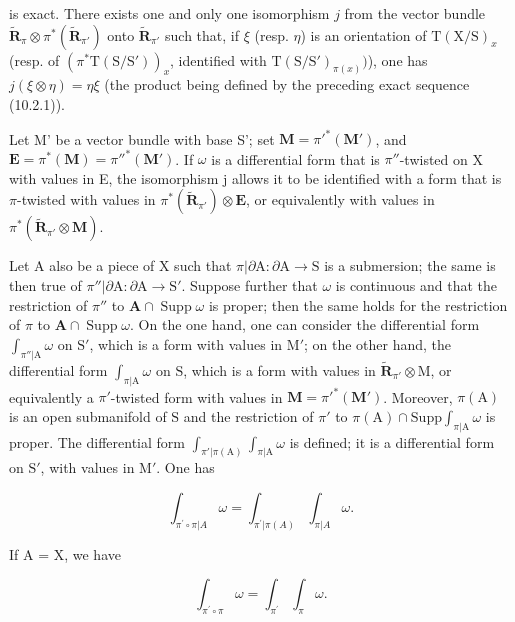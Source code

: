 is exact. There exists one and only one isomorphism \(j\) from the vector bundle \(\tilde{\mathbf{R}}_{\pi} \otimes \pi^{*}(\tilde{\mathbf{R}}_{\pi'})\) onto \(\tilde{\mathbf{R}}_{\pi'}\) such that, if \(\xi\) (resp. \(\eta\)) is an orientation of \(\mathrm{T}(\mathrm{X}/\mathrm{S})_x\) (resp. of \((\pi^{*}\mathrm{T}(\mathrm{S}/\mathrm{S}'))_x\), identified with \(\mathrm{T}(\mathrm{S}/\mathrm{S}')_{\pi(x)})\)), one has \(j(\xi \otimes \eta) = \eta\xi\) (the product being defined by the preceding exact sequence (10.2.1)).

Let M' be a vector bundle with base S'; set \(\mathbf{M} = \pi'^{*}(\mathbf{M}')\), and \(\mathbf{E}=\pi^{*}(\mathbf{M})=\pi''^{*}(\mathbf{M}')\). If \(\omega\) is a differential form that is \(\pi''\)-twisted on X with values in E, the isomorphism j allows it to be identified with a form that is \(\pi\)-twisted with values in \(\pi^{*}(\tilde{\mathbf{R}}_{\pi'}) \otimes \mathbf{E}\), or equivalently with values in \(\pi^{*}(\tilde{\mathbf{R}}_{\pi'} \otimes \mathbf{M})\).

Let A also be a piece of X such that \(\pi|\partial\mathrm{A}:\partial\mathrm{A}\to\mathrm{S}\) is a submersion; the same is then true of \(\pi''|\partial\mathrm{A}:\partial\mathrm{A}\to\mathrm{S}'\). Suppose further that \(\omega\) is continuous and that the restriction of \(\pi''\) to \(\mathbf{A}\cap\operatorname{Supp}\omega\) is proper; then the same holds for the restriction of \(\pi\) to \(\mathbf{A}\cap\operatorname{Supp}\omega\). On the one hand, one can consider the differential form \(\int_{\pi''|\mathrm{A}}\omega\) on \(\mathrm{S}'\), which is a form with values in \(\mathrm{M}'\); on the other hand, the differential form \(\int_{\pi|\mathrm{A}}\omega\) on \(\mathrm{S}\), which is a form with values in \(\tilde{\mathbf{R}}_{\pi'}\otimes\mathrm{M}\), or equivalently a \(\pi'\)-twisted form with values in \(\mathbf{M}=\pi'^{*}(\mathbf{M}')\). Moreover, \(\pi(\mathrm{A})\) is an open submanifold of \(\mathrm{S}\) and the restriction of \(\pi'\) to \(\pi(\mathrm{A})\cap\mathrm{Supp}\int_{\pi|\mathrm{A}}\omega\) is proper. The differential form \(\int_{\pi'|\pi(\mathrm{A})}\int_{\pi|\mathrm{A}}\omega\) is defined; it is a differential form on \(\mathrm{S}'\), with values in \(\mathrm{M}'\). One has

\[
\int_ {\pi^ {\prime} \circ \pi | A} \omega = \int_ {\pi^ {\prime} | \pi (A)} \int_ {\pi | A} \omega .
\]

If A = X, we have

\[
\int_ {\pi^ {\prime} \circ \pi} \omega = \int_ {\pi^ {\prime}} \int_ {\pi} \omega .
\]

